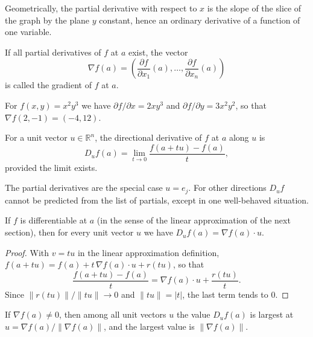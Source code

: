Geometrically, the partial derivative with respect to $x$ is the slope of the slice of the
graph by the plane $y$ constant, hence an ordinary derivative of a function of one variable.


\begin{definisi}[Gradient]
If all partial derivatives of $f$ at $a$ exist, the vector
\[
  \nabla f(a)=\left(\frac{\partial f}{\partial x_{1}}(a),\dots,
  \frac{\partial f}{\partial x_{n}}(a)\right)
\]
is called the gradient of $f$ at $a$.
\end{definisi}

For $f(x,y)=x^{2}y^{3}$ we have $\partial f/\partial x=2xy^{3}$ and
$\partial f/\partial y=3x^{2}y^{2}$, so that $\nabla f(2,-1)=(-4,12)$.

\begin{definisi}
For a unit vector $u\in\mathbb{R}^{n}$, the directional derivative of $f$ at $a$ along $u$ is
\[
  D_{u}f(a)=\lim_{t\to0}\frac{f(a+tu)-f(a)}{t},
\]
provided the limit exists.
\end{definisi}

The partial derivatives are the special case $u=e_{j}$. For other directions $D_{u}f$ cannot
be predicted from the list of partials, except in one well-behaved situation.

\begin{proposisi}
If $f$ is differentiable at $a$ (in the sense of the linear approximation of the next section),
then for every unit vector $u$ we have $D_{u}f(a)=\nabla f(a)\cdot u$.
\end{proposisi}

\begin{proof}
With $v=tu$ in the linear approximation definition,
$f(a+tu)=f(a)+t\,\nabla f(a)\cdot u+r(tu)$, so that
\[
  \frac{f(a+tu)-f(a)}{t}=\nabla f(a)\cdot u+\frac{r(tu)}{t}.
\]
Since $\|r(tu)\|/\|tu\|\to0$ and $\|tu\|=|t|$, the last term tends to $0$.
\end{proof}

\begin{proposisi}
If $\nabla f(a)\neq0$, then among all unit vectors $u$ the value $D_{u}f(a)$ is largest at
$u=\nabla f(a)/\|\nabla f(a)\|$, and the largest value is $\|\nabla f(a)\|$.
\end{proposisi}

